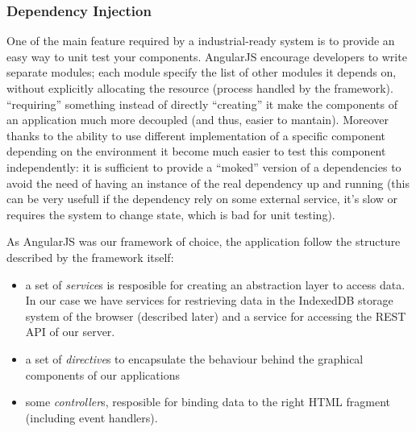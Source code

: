 \documentclass[a4paper,12pt]{report}
\begin{document}
\subsubsection{Dependency Injection}
One of the main feature required by a industrial-ready system is to provide an easy way to unit test your components. AngularJS encourage developers to write separate modules; each module specify the list of other modules it depends on, without explicitly allocating the resource (process handled by the framework). ``requiring'' something instead of directly ``creating'' it make the components of an application much more decoupled (and thus, easier to mantain). Moreover thanks to the ability to use different implementation of a specific component depending on the environment it become much easier to test this component independently: it is sufficient to provide a ``moked'' version of a dependencies to avoid the need of having an instance of the real dependency up and running (this can be very usefull if the dependency rely on some external service, it's slow or requires the system to change state, which is bad for unit testing).


As AngularJS was our framework of choice, the application follow the structure described by the framework itself:
\begin{itemize}
\item a set of \emph{service}s is resposible for creating an abstraction layer to access data. In our case we have services for restrieving data in the IndexedDB storage system of the browser (described later) and a service for accessing the REST API of our server.
\item a set of \emph{directive}s to encapsulate the behaviour behind the graphical components of our applications 
\item some \emph{controller}s, resposible for binding data to the right HTML fragment (including event handlers).
\end{itemize}
\end{document}
